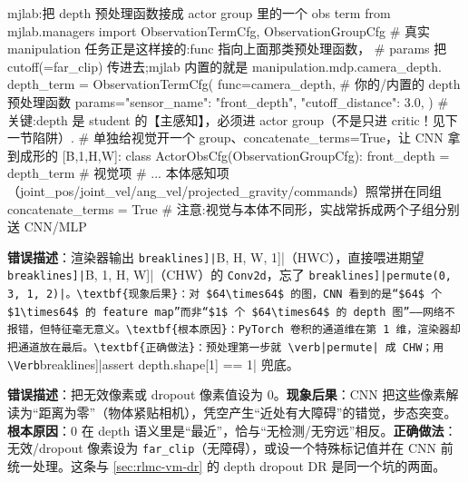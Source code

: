 \begin{codebox}[Python]{mjlab:把 depth 预处理函数接成 actor group 里的一个 obs term}
from mjlab.managers import ObservationTermCfg, ObservationGroupCfg
# 真实 manipulation 任务正是这样接的:func 指向上面那类预处理函数，
# params 把 cutoff(=far_clip) 传进去;mjlab 内置的就是 manipulation.mdp.camera_depth.
depth_term = ObservationTermCfg(
    func=camera_depth,                      # 你的/内置的 depth 预处理函数
    params={"sensor_name": "front_depth", "cutoff_distance": 3.0},
)
# 关键:depth 是 student 的【主感知】，必须进 actor group（不是只进 critic！见下一节陷阱）.
# 单独给视觉开一个 group、concatenate_terms=True，让 CNN 拿到成形的 [B,1,H,W]:
class ActorObsCfg(ObservationGroupCfg):
    front_depth = depth_term                # 视觉项
    # ... 本体感知项（joint_pos/joint_vel/ang_vel/projected_gravity/commands）照常拼在同组
    concatenate_terms = True                # 注意:视觉与本体不同形，实战常拆成两个子组分别送 CNN/MLP
\end{codebox}


\begin{pitfall}
\textbf{错误描述}：渲染器输出 \Verb[breaklines]|[B, H, W, 1]|（HWC），直接喂进期望 \Verb[breaklines]|[B, 1, H, W]|（CHW）的 \verb|Conv2d|，忘了 \Verb[breaklines]|permute(0, 3, 1, 2)|。\textbf{现象后果}：对 $64\times64$ 的图，CNN 看到的是“$64$ 个 $1\times64$ 的 feature map”而非“$1$ 个 $64\times64$ 的 depth 图”——网络不报错，但特征毫无意义。\textbf{根本原因}：PyTorch 卷积的通道维在第 1 维，渲染器却把通道放在最后。\textbf{正确做法}：预处理第一步就 \verb|permute| 成 CHW；用 \Verb[breaklines]|assert depth.shape[1] == 1| 兜底。
\end{pitfall}

\begin{pitfall}
\textbf{错误描述}：把无效像素或 dropout 像素值设为 $0$。\textbf{现象后果}：CNN 把这些像素解读为“距离为零”（物体紧贴相机），凭空产生“近处有大障碍”的错觉，步态突变。\textbf{根本原因}：$0$ 在 depth 语义里是“最近”，恰与“无检测/无穷远”相反。\textbf{正确做法}：无效/dropout 像素设为 \verb|far_clip|（无障碍），或设一个特殊标记值并在 CNN 前统一处理。这条与 \cref{sec:rlmc-vm-dr} 的 depth dropout DR 是同一个坑的两面。
\end{pitfall}

